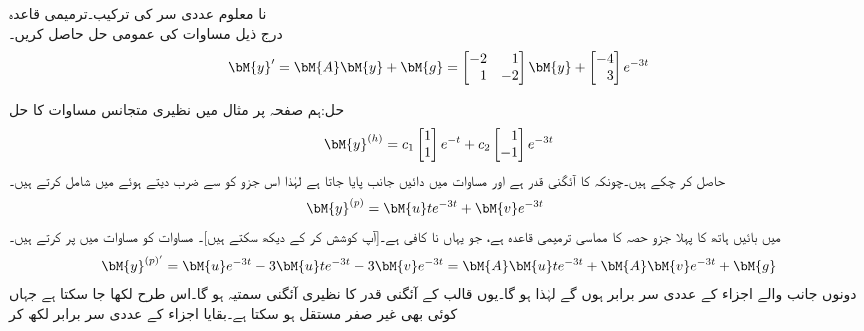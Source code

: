 \quad نا معلوم عددی سر کی ترکیب۔ترمیمی قاعدہ\\
درج ذیل مساوات کی عمومی حل حاصل کریں۔
\begin{align}\label{مساوات_مثال_غیر_متجانس_نا_معلوم_سر_الف}
\bM{y}'=\bM{A}\bM{y}+\bM{g}=\begin{bmatrix*}[r] -2&1\\1&-2 \end{bmatrix*} \bM{y}+\begin{bmatrix*}[r] -4\\3 \end{bmatrix*} e^{-3t}
\end{align}

حل:ہم صفحہ  پر مثال  میں نظیری متجانس مساوات کا حل 
\begin{align}\label{مساوات_مثال_غیر_متجانس_نا_معلوم_سر_ب}
\bM{y}^{(h)}=c_1\begin{bmatrix} 1 \\ 1 \end{bmatrix}e^{-t}+c_2\begin{bmatrix*}[r] 1\\ -1 \end{bmatrix*}e^{-3t}
\end{align}
حاصل کر چکے ہیں۔چونکہ  کا   آئگنی قدر ہے اور مساوات  میں دائیں جانب  پایا جاتا ہے لہٰذا  اس جزو کو  سے ضرب دیتے ہوئے  میں شامل کرتے ہیں۔
\begin{align}\label{مساوات_مثال_غیر_متجانس_نا_معلوم_سر_پ}
\bM{y}^{(p)}=\bM{u}te^{-3t}+\bM{v}e^{-3t} \quad \quad 
\end{align} 
 میں بائیں ہاتھ کا پہلا جزو حصہ  کا مماسی  ترمیمی قاعدہ ہے، جو یہاں نا کافی ہے۔[آپ کوشش کر کے دیکھ سکتے ہیں]۔ مساوات  کو مساوات  میں پر کرتے ہیں۔
\begin{align*}
\bM{y}^{(p)'}=\bM{u}e^{-3t}-3\bM{u}te^{-3t}-3\bM{v}e^{-3t}=\bM{A}\bM{u}te^{-3t}+\bM{A}\bM{v}e^{-3t}+\bM{g}
\end{align*}
دونوں جانب  والے اجزاء کے عددی سر برابر ہوں گے لہٰذا  ہو گا۔یوں  قالب کے آئگنی قدر  کا نظیری آئگنی سمتیہ  ہو گا۔اس طرح  لکھا جا سکتا ہے جہاں  کوئی بھی غیر صفر مستقل ہو سکتا ہے۔بقایا اجزاء کے عددی سر برابر لکھ کر

